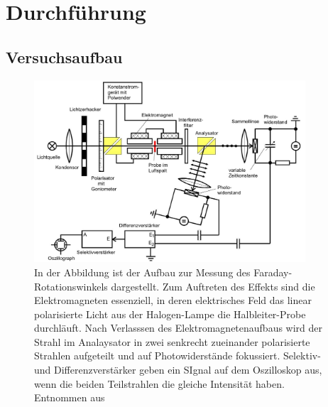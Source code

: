\newpage
\section{Durchführung}
    \subsection{Versuchsaufbau}

        \FloatBarrier

        \begin{figure}[h]
          \centering
          \includegraphics[width = 0.9\textwidth]{pictures/Aufbau.jpg}
          \caption{In der Abbildung ist der Aufbau zur Messung des Faraday-Rotationswinkels dargestellt. Zum Auftreten des Effekts sind die Elektromagneten essenziell, in deren elektrisches Feld das linear polarisierte Licht aus der Halogen-Lampe die Halbleiter-Probe durchläuft. Nach Verlasssen des Elektromagnetenaufbaus wird der Strahl im Analaysator in zwei senkrecht zueinander polarisierte Strahlen  aufgeteilt und auf Photowiderstände fokussiert. Selektiv- und Differenzverstärker geben ein SIgnal auf dem Oszilloskop aus, wenn die beiden Teilstrahlen die gleiche Intensität haben. Entnommen aus~\cite{tu_dortmund_versuchsanleitung_2021-2}}
          \label{fig:Aufbau}
        \end{figure}

        \FloatBarrier

